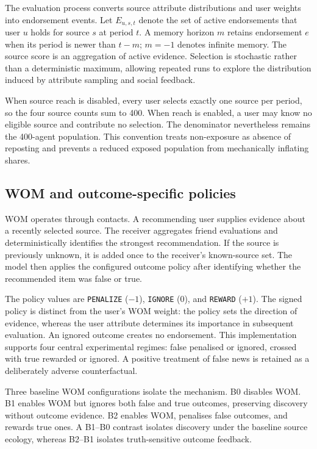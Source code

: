 The evaluation process converts source attribute distributions and user weights into endorsement events. Let $E_{u,s,t}$ denote the set of active endorsements that user $u$ holds for source $s$ at period $t$. A memory horizon $m$ retains endorsement $e$ when its period is newer than $t-m$; $m=-1$ denotes infinite memory. The source score is an aggregation of active evidence. Selection is stochastic rather than a deterministic maximum, allowing repeated runs to explore the distribution induced by attribute sampling and social feedback.

When source reach is disabled, every user selects exactly one source per period, so the four source counts sum to 400. When reach is enabled, a user may know no eligible source and contribute no selection. The denominator nevertheless remains the 400-agent population. This convention treats non-exposure as absence of reposting and prevents a reduced exposed population from mechanically inflating shares.

\subsection{WOM and outcome-specific policies}

WOM operates through contacts. A recommending user supplies evidence about a recently selected source. The receiver aggregates friend evaluations and deterministically identifies the strongest recommendation. If the source is previously unknown, it is added once to the receiver's known-source set. The model then applies the configured outcome policy after identifying whether the recommended item was false or true.

The policy values are \texttt{PENALIZE} ($-1$), \texttt{IGNORE} ($0$), and \texttt{REWARD} ($+1$). The signed policy is distinct from the user's WOM weight: the policy sets the direction of evidence, whereas the user attribute determines its importance in subsequent evaluation. An ignored outcome creates no endorsement. This implementation supports four central experimental regimes: false penalised or ignored, crossed with true rewarded or ignored. A positive treatment of false news is retained as a deliberately adverse counterfactual.

Three baseline WOM configurations isolate the mechanism. B0 disables WOM. B1 enables WOM but ignores both false and true outcomes, preserving discovery without outcome evidence. B2 enables WOM, penalises false outcomes, and rewards true ones. A B1--B0 contrast isolates discovery under the baseline source ecology, whereas B2--B1 isolates truth-sensitive outcome feedback.

